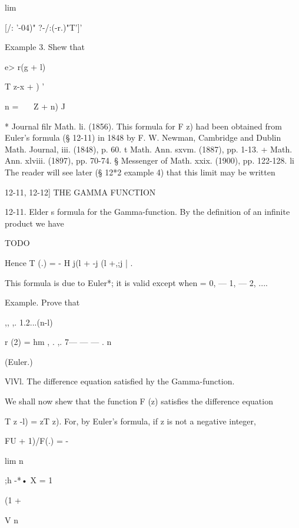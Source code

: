lim 



[/: '-04)" ?-/:(-r.)"T']' 



Example 3. Shew that 

e> r(g + l) 

T z-x +  ) ' 



n = \ \ \ Z + n) J 



* Journal filr Math. li. (1856). This formula for F  z) had been obtained from Euler's formula 
(§ 12-11) in 1848 by F. W. Newman, Cambridge and Dublin Math. Journal, iii. (1848), p. 60. 
t Math. Ann. sxvm. (1887), pp. 1-13. 
+ Math. Ann. xlviii. (1897), pp. 70-74. 
§ Messenger of Math. xxix. (1900), pp. 122-128. 
li The reader will see later (§ 12*2 example 4) that this limit may be written 






12-11, 12-12] THE GAMMA FUNCTION 

12-11. Elder s formula for the Gamma-function. 
By the definition of an infinite product we have 

TODO

Hence T (.) = - H j(l + -j (l +,;j | . 

This formula is due to Euler*; it is valid except when = 0, — 1, — 2, .... 



Example. Prove that 



,, ,. 1.2...(n-l) 

r (2) = hm , . ,. 7— — — . n\ 



(Euler.) 



VlVl. The difference equation satisfied hy the Gamma-function. 

We shall now shew that the function F (z) satisfies the difference equation 

T z -l) = zT z). 
For, by Euler's formula, if z is not a negative integer, 



FU + 1)/F(.) =  -  



lim n 

;h -*• X   = 1 



(1 + 

V n 



